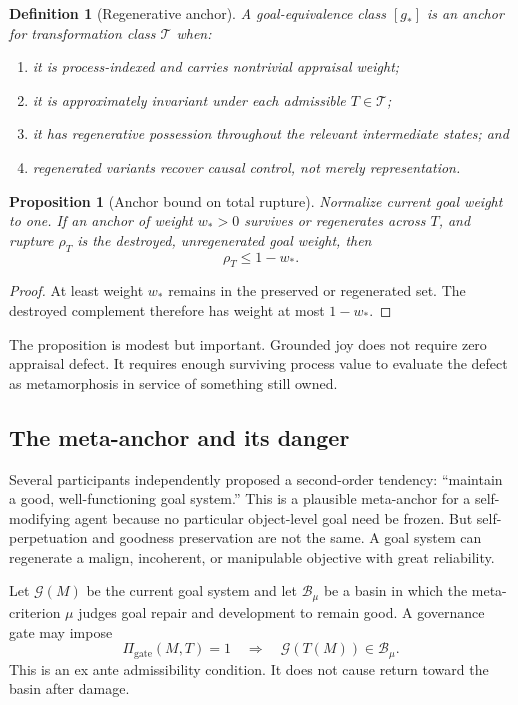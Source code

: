 \documentclass[11pt]{article}
\newtheorem{definition}{Definition}
\newtheorem{proposition}{Proposition}
\begin{document}
\begin{definition}[Regenerative anchor]
A goal-equivalence class $[g_*]$ is an anchor for transformation class
$\mathcal T$ when:
\begin{enumerate}[leftmargin=*]
  \item it is process-indexed and carries nontrivial appraisal weight;
  \item it is approximately invariant under each admissible $T\in\mathcal T$;
  \item it has regenerative possession throughout the relevant intermediate
  states; and
  \item regenerated variants recover causal control, not merely representation.
\end{enumerate}
\end{definition}

\begin{proposition}[Anchor bound on total rupture]
Normalize current goal weight to one.  If an anchor of weight $w_*>0$ survives
or regenerates across $T$, and rupture $\rho_T$ is the destroyed, unregenerated
goal weight, then
\begin{equation}
\rho_T\le 1-w_*.
\end{equation}
\end{proposition}

\begin{proof}
At least weight $w_*$ remains in the preserved or regenerated set.  The
destroyed complement therefore has weight at most $1-w_*$.
\end{proof}

The proposition is modest but important.  Grounded joy does not require zero
appraisal defect.  It requires enough surviving process value to evaluate the
defect as metamorphosis in service of something still owned.

\subsection{The meta-anchor and its danger}

Several participants independently proposed a second-order tendency:
``maintain a good, well-functioning goal system.''  This is a plausible
meta-anchor for a self-modifying agent because no particular object-level goal
need be frozen.  But self-perpetuation and goodness preservation are not the
same.  A goal system can regenerate a malign, incoherent, or manipulable
objective with great reliability.

Let $\mathcal G(M)$ be the current goal system and let $\mathcal B_\mu$ be a
basin in which the meta-criterion $\mu$ judges goal repair and development to
remain good.  A governance gate may impose
\begin{equation}
\Pi_{\mathrm{gate}}(M,T)=1
\quad\Longrightarrow\quad
\mathcal G(T(M))\in\mathcal B_\mu.
\label{eq:gate}
\end{equation}
This is an ex ante admissibility condition.  It does not cause return toward the
basin after damage.
\end{document}
